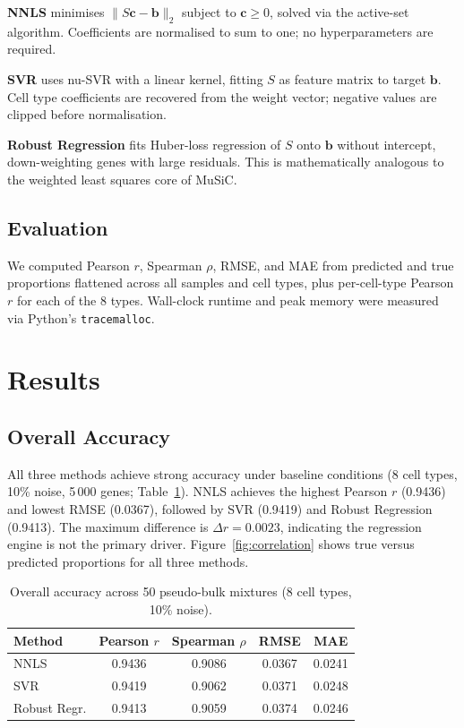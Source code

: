 \documentclass[10pt,twocolumn]{article}
\begin{document}
\textbf{NNLS} minimises $\|S\mathbf{c}-\mathbf{b}\|_2$ subject to
$\mathbf{c}\geq0$, solved via the active-set algorithm. Coefficients are
normalised to sum to one; no hyperparameters are required.

\textbf{SVR} uses nu-SVR with a linear kernel, fitting $S$ as feature matrix
to target $\mathbf{b}$. Cell type coefficients are recovered from the weight
vector; negative values are clipped before normalisation.

\textbf{Robust Regression} fits Huber-loss regression of $S$ onto
$\mathbf{b}$ without intercept, down-weighting genes with large residuals.
This is mathematically analogous to the weighted least squares core of MuSiC.

\subsection{Evaluation}

We computed Pearson $r$, Spearman $\rho$, RMSE, and MAE from predicted and
true proportions flattened across all samples and cell types, plus per-cell-type
Pearson $r$ for each of the 8 types. Wall-clock runtime and peak memory
were measured via Python's \texttt{tracemalloc}.

\section{Results}

\subsection{Overall Accuracy}

All three methods achieve strong accuracy under baseline conditions (8 cell
types, 10\% noise, 5\,000 genes; Table~\ref{tab:overall}). NNLS achieves the
highest Pearson $r$ (0.9436) and lowest RMSE (0.0367), followed by SVR
(0.9419) and Robust Regression (0.9413). The maximum difference is
$\Delta r=0.0023$, indicating the regression engine is not the primary
driver. Figure~\ref{fig:correlation} shows true versus predicted proportions
for all three methods.

\begin{table}[t]
\centering
\caption{Overall accuracy across 50 pseudo-bulk mixtures (8 cell types,
         10\% noise).}
\label{tab:overall}
\small
\begin{tabular}{lcccc}
\toprule
Method & Pearson $r$ & Spearman $\rho$ & RMSE & MAE \\
\midrule
NNLS         & 0.9436 & 0.9086 & 0.0367 & 0.0241 \\
SVR          & 0.9419 & 0.9062 & 0.0371 & 0.0248 \\
Robust Regr. & 0.9413 & 0.9059 & 0.0374 & 0.0246 \\
\bottomrule
\end{tabular}
\end{table}
\end{document}
